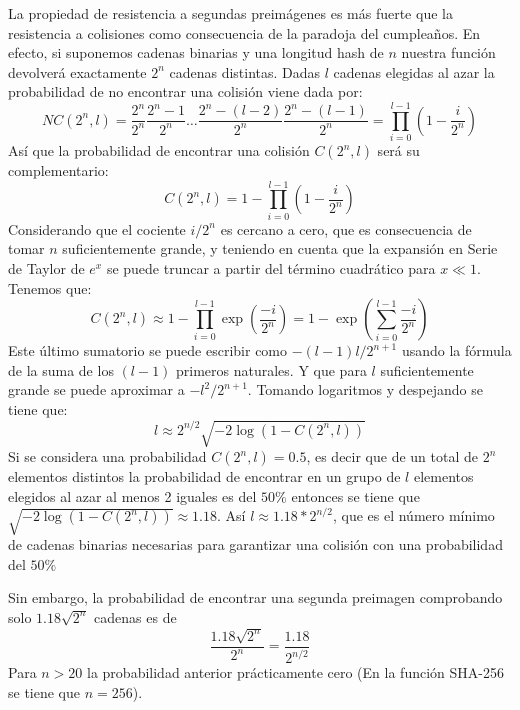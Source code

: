 La propiedad de resistencia a segundas preimágenes es  más fuerte que la resistencia a colisiones como consecuencia de la paradoja del cumpleaños. En efecto, si suponemos cadenas binarias y una longitud hash de $n$ nuestra función devolverá exactamente $2^{n}$ cadenas distintas. Dadas $l$ cadenas elegidas al azar la probabilidad de no encontrar una colisión viene dada por:
\begin{equation}
NC(2^{n},l) = \frac{2^{n}}{2^{n}}\frac{2^{n}-1}{2^{n}}\ldots\frac{2^{n}-(l-2)}{2^{n}}\frac{2^{n}-(l-1)}{2^{n}} = \prod_{i=0}^{l-1}(1-\frac{i}{2^{n}})
\end{equation} 
Así que la probabilidad de encontrar una colisión $C(2^{n},l)$ será su complementario:
\begin{equation}
C(2^{n},l) = 1-\prod_{i=0}^{l-1}(1-\frac{i}{2^{n}})
\end{equation}
Considerando que el cociente $i/2^{n}$ es cercano a cero, que es consecuencia de tomar $n$ suficientemente grande, y teniendo en cuenta que la expansión en Serie de Taylor de $e^{x}$ se puede truncar a partir del término cuadrático para $x \ll 1$. Tenemos que:
\begin{equation}
C(2^{n},l) \approx 1- \prod_{i=0}^{l-1}\exp\left(\frac{-i}{2^{n}}\right) = 1- \exp\left(\sum_{i=0}^{l-1}\frac{-i}{2^{n}}\right)
\end{equation} 
Este último sumatorio se puede escribir como $-(l-1)l/2^{n+1}$ usando la fórmula de la suma de los $(l-1)$ primeros naturales. Y que para $l$ suficientemente grande se puede aproximar a $-l^{2}/2^{n+1}$.
Tomando logaritmos y despejando se tiene que:
\begin{equation}
l \approx 2^{n/2}\sqrt{-2\log(1-C(2^{n},l))}
\end{equation}
Si se considera una probabilidad $C(2^{n},l) = 0.5$, es decir que de un total de $2^{n}$ elementos distintos la probabilidad de encontrar en un grupo de $l$ elementos elegidos al azar al menos 2 iguales es del $50\%$  entonces se tiene que $\sqrt{-2\log(1-C(2^{n},l))}\approx 1.18$. Así  $l \approx 1.18*2^{n/2}$, que es el número mínimo de cadenas binarias necesarias para garantizar una colisión con una probabilidad del $50\%$


 Sin embargo, la probabilidad de encontrar una segunda preimagen comprobando solo $1.18\sqrt{2^{n}}$ cadenas es de 
 \begin{equation}\label{preimagen_eq}
\frac{1.18\sqrt{2^{n}}}{2^{n}} = \frac{1.18}{2^{n/2}}
\end{equation}
Para $n > 20$ la probabilidad anterior prácticamente cero (En la función SHA-256 se tiene que $n = 256$).

